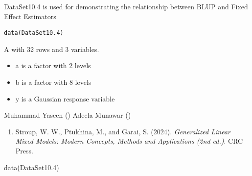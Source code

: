 \documentclass[a4paper]{book}
\begin{document}
%
\begin{Description}
DataSet10.4 is used for demonstrating the relationship between BLUP and Fixed Effect Estimators
\end{Description}
%
\begin{Usage}
\begin{verbatim}
data(DataSet10.4)
\end{verbatim}
\end{Usage}
%
\begin{Format}
A  with 32 rows and 3 variables.
\end{Format}
%
\begin{Details}
\begin{itemize}

\item{} a  is a factor with 2 levels
\item{} b  is a factor with 8 levels
\item{} y  is a Gaussian response variable

\end{itemize}

\end{Details}
%
\begin{Author}
Muhammad Yaseen ()
Adeela Munawar ()
\end{Author}
%
\begin{References}
\begin{enumerate}

\item{} Stroup, W. W., Ptukhina, M., and Garai, S. (2024).
\emph{Generalized Linear Mixed Models: Modern Concepts, Methods and Applications (2nd ed.)}.
CRC Press.

\end{enumerate}

\end{References}
%
\begin{SeeAlso}
\end{SeeAlso}
%
\begin{Examples}
\begin{ExampleCode}
data(DataSet10.4)
\end{ExampleCode}
\end{Examples}
\end{document}
